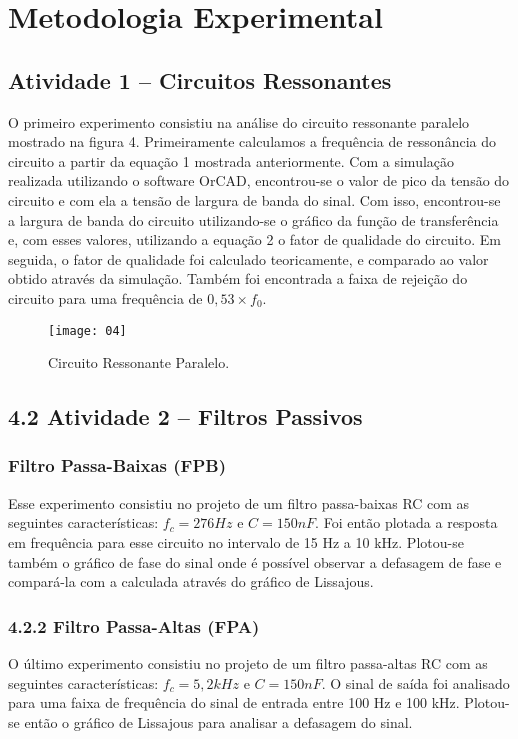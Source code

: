 \newpage
\section{Metodologia Experimental}

    \subsection{Atividade 1 – Circuitos Ressonantes}
        O primeiro experimento consistiu na análise do circuito ressonante 
        paralelo mostrado na figura 4. Primeiramente calculamos a frequência de 
        ressonância do circuito a partir da equação 1 mostrada anteriormente. 
        Com a simulação realizada utilizando o software OrCAD, encontrou-se o 
        valor de pico da tensão do circuito e com ela a tensão de largura de 
        banda do sinal. Com isso, encontrou-se a largura de banda do circuito 
        utilizando-se o gráfico da função de transferência e, com esses 
        valores, utilizando a equação 2 o fator de qualidade do circuito. Em 
        seguida, o fator de qualidade foi calculado teoricamente, e comparado 
        ao valor obtido através da simulação.
        Também foi encontrada a faixa de rejeição do circuito para uma 
        frequência de $0,53 \times f_0$.
        
        \begin{figure}[H]
          \centering
          \caption{Circuito Ressonante Paralelo.}
          \texttt{[image: 04]}
          
          \label{fig:04}
        \end{figure}
        
        

    \subsection{4.2 Atividade 2 – Filtros Passivos}
    
    \subsubsection{Filtro Passa-Baixas (FPB)}
        Esse experimento consistiu no projeto de um filtro passa-baixas RC com 
        as seguintes características: $f_c = 276 Hz$ e $C = 150 nF$. Foi então 
        plotada a resposta em frequência para esse circuito no intervalo de 15 
        Hz a 10 kHz. Plotou-se também o gráfico de fase do sinal onde é 
        possível observar a defasagem de fase e compará-la com a calculada 
        através do gráfico de Lissajous.

    \subsubsection{4.2.2 Filtro Passa-Altas (FPA)}
        O último experimento consistiu no projeto de um filtro passa-altas RC 
        com as seguintes características: $f_c = 5,2 kHz$ e $C = 150 nF$. O 
        sinal de saída foi analisado para uma faixa de frequência do sinal de 
        entrada entre 100 Hz e 100 kHz. Plotou-se então o gráfico de Lissajous 
        para analisar a defasagem do sinal.
        
        